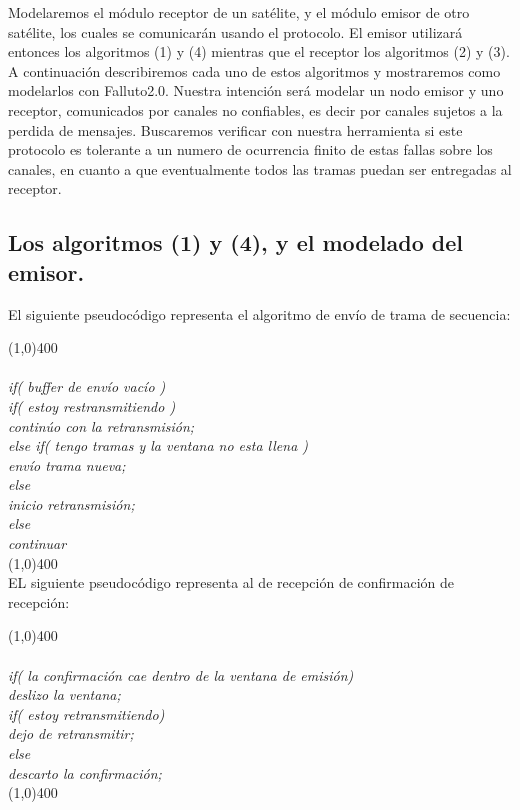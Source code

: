 \documentclass[pdftex,a4paper,12pt]{book}
\begin{document}
Modelaremos el m\'odulo receptor de un sat\'elite, y el m\'odulo emisor de otro sat\'elite, los cuales se comunicar\'an usando el protocolo. El emisor utilizar\'a entonces los algoritmos (1) y (4) mientras que el receptor los algoritmos (2) y (3). A continuaci\'on describiremos cada uno de estos algoritmos y mostraremos como modelarlos con Falluto2.0. Nuestra intenci\'on ser\'a modelar un nodo emisor y uno receptor, comunicados por canales no confiables, es decir por canales sujetos a la perdida de mensajes. Buscaremos verificar con nuestra herramienta si este protocolo es tolerante a un numero de ocurrencia finito de estas fallas sobre los canales, en cuanto a que eventualmente todos las tramas puedan ser entregadas al receptor.


\subsection*{Los algoritmos (1) y (4), y el modelado del emisor.}


El siguiente pseudoc\'odigo representa el algoritmo de env\'io de trama de secuencia:

\noindent \line(1,0){400}
\textit{\\\\
\noindent if( buffer de env\'io vac\'io )\\
\indent if( estoy restransmitiendo )\\
\indent \indent contin\'uo con la retransmisi\'on;\\
\indent else if( tengo tramas y la ventana no esta llena )\\
\indent \indent env\'io trama nueva;\\
\indent else \\
\indent \indent inicio retransmisi\'on;\\
\noindent else \\
\indent continuar \\
}
\noindent \line(1,0){400}\\

EL siguiente pseudoc\'odigo representa al de recepci\'on de confirmaci\'on de recepci\'on:

\noindent \line(1,0){400}
\textit{\\\\
if( la confirmaci\'on cae dentro de la ventana de emisi\'on)\\
\indent    deslizo la ventana;\\
\indent    if( estoy retransmitiendo)\\
\indent \indent dejo de retransmitir;\\
else\\
\indent descarto la confirmaci\'on;\\
}
\noindent \line(1,0){400}\\
\end{document}
